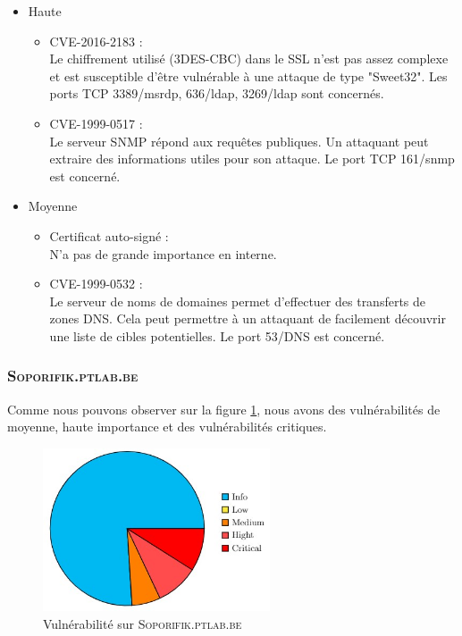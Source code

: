 \documentclass[a4paper]{article}
\begin{document}
\begin{itemize}
    \item Haute
    \begin{itemize}
        \item CVE-2016-2183 :\\
        Le chiffrement utilisé (3DES-CBC) dans le SSL n'est pas assez complexe et est susceptible d'être vulnérable à une attaque de type "Sweet32". Les ports TCP 3389/msrdp, 636/ldap, 3269/ldap sont concernés.
        \item CVE-1999-0517 :\\
        Le serveur SNMP répond aux requêtes publiques. Un attaquant peut extraire des informations utiles pour son attaque. Le port TCP 161/snmp est concerné.
    \end{itemize}
    \item Moyenne
    \begin{itemize}
        \item Certificat auto-signé :\\
        N'a pas de grande importance en interne.
        \item CVE-1999-0532 :\\
        Le serveur de noms de domaines permet d'effectuer des transferts de zones DNS. Cela peut permettre à un attaquant de facilement découvrir une liste de cibles potentielles. Le port 53/DNS est concerné.
    \end{itemize}
\end{itemize}












\subsubsection{\textsc{Soporifik.ptlab.be}}\label{app:vulns2}
Comme nous pouvons observer sur la figure \ref{fig:vuln2}, nous avons des vulnérabilités de moyenne, haute importance et des vulnérabilités critiques.
\begin{figure}[H]
    \centering
    \includegraphics[width=0.6\textwidth]{images/graphiques/4.jpg}
    \caption{Vulnérabilité sur \textsc{Soporifik.ptlab.be}}
    \label{fig:vuln2}
\end{figure}
\end{document}
